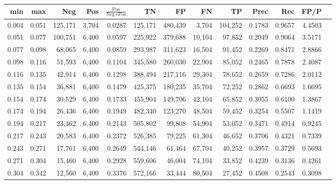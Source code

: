 \begin{tabular}{rrrrrrrrrrrrr}
\toprule
  min &   max &     Neg &   Pos & $\frac{\text{Pos}}{\text{Neg}+\text{Pos}}$ &      TN &      FP &      FN &      TP &   Prec &    Rec &   FP/P \\
\midrule
0.004 & 0.051 & 125,171 & 3,704 &                                     0.0287 & 125,171 & 480,439 &   3,704 & 104,252 & 0.1783 & 0.9657 & 4.4503 \\
0.051 & 0.077 & 100,751 & 6,400 &                                     0.0597 & 225,922 & 379,688 &  10,104 &  97,852 & 0.2049 & 0.9064 & 3.5171 \\
0.077 & 0.098 &  68,065 & 6,400 &                                     0.0859 & 293,987 & 311,623 &  16,504 &  91,452 & 0.2269 & 0.8471 & 2.8866 \\
0.098 & 0.116 &  51,593 & 6,400 &                                     0.1104 & 345,580 & 260,030 &  22,904 &  85,052 & 0.2465 & 0.7878 & 2.4087 \\
0.116 & 0.135 &  42,914 & 6,400 &                                     0.1298 & 388,494 & 217,116 &  29,304 &  78,652 & 0.2659 & 0.7286 & 2.0112 \\
0.135 & 0.154 &  36,881 & 6,400 &                                     0.1479 & 425,375 & 180,235 &  35,704 &  72,252 & 0.2862 & 0.6693 & 1.6695 \\
0.154 & 0.174 &  30,529 & 6,400 &                                     0.1733 & 455,904 & 149,706 &  42,104 &  65,852 & 0.3055 & 0.6100 & 1.3867 \\
0.174 & 0.194 &  26,436 & 6,400 &                                     0.1949 & 482,340 & 123,270 &  48,504 &  59,452 & 0.3254 & 0.5507 & 1.1419 \\
0.194 & 0.217 &  23,462 & 6,400 &                                     0.2143 & 505,802 &  99,808 &  54,904 &  53,052 & 0.3471 & 0.4914 & 0.9245 \\
0.217 & 0.243 &  20,583 & 6,400 &                                     0.2372 & 526,385 &  79,225 &  61,304 &  46,652 & 0.3706 & 0.4321 & 0.7339 \\
0.243 & 0.271 &  17,761 & 6,400 &                                     0.2649 & 544,146 &  61,464 &  67,704 &  40,252 & 0.3957 & 0.3729 & 0.5693 \\
0.271 & 0.304 &  15,460 & 6,400 &                                     0.2928 & 559,606 &  46,004 &  74,104 &  33,852 & 0.4239 & 0.3136 & 0.4261 \\
0.304 & 0.342 &  12,560 & 6,400 &                                     0.3376 & 572,166 &  33,444 &  80,504 &  27,452 & 0.4508 & 0.2543 & 0.3098 \\

\end{tabular}
